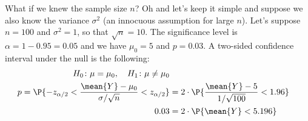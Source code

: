 
What if we knew the sample size $n$? Oh and let's keep it simple and suppose we also know the variance $\sigma^2$ (an innocuous assumption for large $n$). Let's suppose $n=100$ and $\sigma^2=1$, so that $\sqrt{n}=10$. The significance level is $\alpha=1-0.95=0.05$ and we have $\mu_0=5$ and $p=0.03$.
A two-sided confidence interval under the null is the following:
\begin{align*}
H_0 \colon \mu = \mu_0, \quad H_1 \colon \mu \ne \mu_0\\
p = \P{-z_{\alpha/2}
    < \frac{\mean{Y}-\mu_0}{\sigma/\sqrt{n}} 
    < z_{\alpha/2} }
    & = 2\cdot\P{\frac{\mean{Y}-5}{1/\sqrt{100}} < 1.96}\\
0.03& = 2\cdot\P{\mean{Y} < 5.196}\\
\end{align*}
